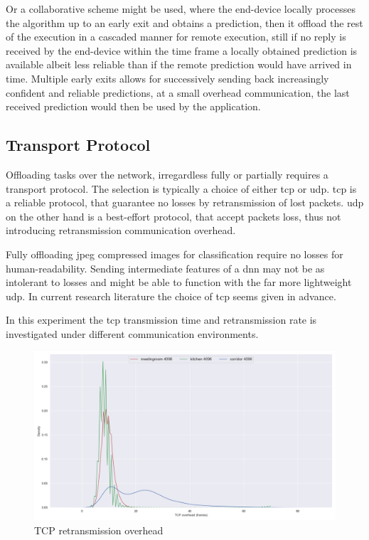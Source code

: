 Or a collaborative scheme might be used, where the end-device locally processes the algorithm up to an early exit and obtains a prediction, then it offload the rest of the execution in a cascaded manner for remote execution, still if no reply is received by the end-device within the time frame a locally obtained prediction is available albeit less reliable than if the remote prediction would have arrived in time. Multiple early exits allows for successively sending back increasingly confident and reliable predictions, at a small overhead communication, the last received prediction would then be used by the application.    
 

\subsection{Transport Protocol} 

Offloading tasks over the network, irregardless fully or partially requires a transport protocol. The selection is typically a choice of either \gls{tcp} or \gls{udp}. \gls{tcp} is a reliable protocol, that guarantee no losses by retransmission of lost packets. \gls{udp} on the other hand is a best-effort protocol, that accept packets loss, thus not introducing retransmission communication overhead. 


Fully offloading \gls{jpeg} compressed images for classification require no losses for human-readability. Sending intermediate features of a \gls{dnn} may not be as intolerant to losses and might be able to function with the far more lightweight \gls{udp}. In current research literature the choice of \gls{tcp} seems given in advance.  

In this experiment the \gls{tcp} transmission time and retransmission rate is investigated under different communication environments. 

\begin{figure}
	\centering
	\includegraphics[width=\linewidth]{figures/tcp/tcpoverhead}
	\caption[TCP retransmission overhead]{TCP retransmission overhead}
\end{figure}